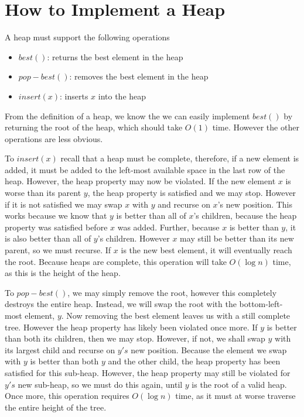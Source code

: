 \section{How to Implement a Heap}

A heap must support the following operations

\begin{itemize}
\item $best()$: returns the best element in the heap
\item $pop-best()$: removes the best element in the heap
\item $insert(x)$: inserts $x$ into the heap
\end{itemize}

From the definition of a heap, we know the we can easily implement
$best()$ by returning the root of the heap, which should take $O(1)$ time.
However the other operations are less obvious. 

To $insert(x)$ recall that a heap must be complete, therefore, if a new
element is added, it must be added to the left-most available space in the
last row of the heap. However, the heap property may now be violated. 
If the new element $x$ is worse than its parent $y$, the heap property is
satisfied and we may stop. However if it is not satisfied we may swap
$x$ with $y$ and recurse on $x$'s new position. This works because we know
that $y$ is better than all of $x$'s children, because the heap property was
satisfied before $x$ was added. Further, because $x$ is better than $y$, it
is also better than all of $y$'s children. However $x$ may still be better than
its new parent, so we must recurse. If $x$ is the new best element, it will
eventually reach the root. Because heaps are complete, this operation will take
$O(\log n)$ time, as this is the height of the heap.

To $pop-best()$, we may simply remove the root,
however this completely destroys the entire heap. Instead, we will swap
the root with the bottom-left-most element, $y$. Now removing the
best element leaves us with a still complete tree. However the heap property
has likely been violated once more. If $y$ is better than both its children,
then we may stop. However, if not, we shall swap $y$ with its largest child
and recurse on $y's$ new position. Because the element we swap with $y$ is
better than both $y$ and the other child, the heap property has been
satisfied for this sub-heap. However, the heap property may still be violated
for $y's$ new sub-heap, so we must do this again, until $y$ is the root
of a valid heap. Once more, this operation
requires $O(\log n)$ time, as it must at worse traverse the entire height
of the tree. 

